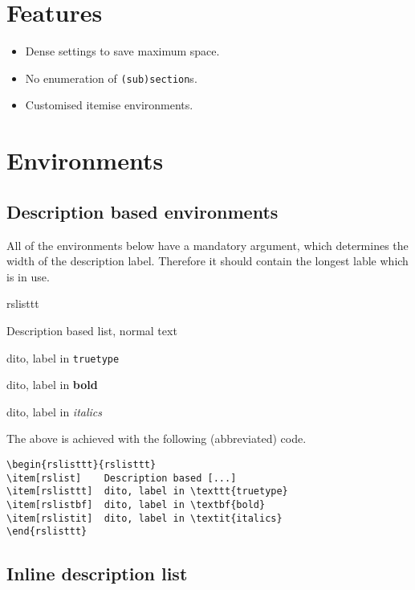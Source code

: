 \documentclass[   %
  final,          %
  a4paper,        %
  portrait,       %
  rscols=3,       %
  margin=1.0cm,   %
  titlepage,      %
]{refsheet}
\begin{document}
\section{Features}

\begin{itemize}
\item Dense settings to save maximum space.
\item No enumeration of \texttt{(sub)section}s.
\item Customised itemise environments.
\end{itemize}

\section{Environments}

\subsection{Description based environments}

All of the environments below have a mandatory argument, 
which determines the width of the description label. 
Therefore it should contain the longest lable which is in use.

\begin{rslisttt}{rslisttt}
\item[rslist]    Description based list, normal text
\item[rslisttt]  dito, label in \texttt{truetype}
\item[rslistbf]  dito, label in \textbf{bold}
\item[rslistit]  dito, label in \textit{italics}
\end{rslisttt}

The above is achieved with the following (abbreviated) code.

\begin{lstlisting}
\begin{rslisttt}{rslisttt}
\item[rslist]    Description based [...]
\item[rslisttt]  dito, label in \texttt{truetype}
\item[rslistbf]  dito, label in \textbf{bold}
\item[rslistit]  dito, label in \textit{italics}
\end{rslisttt}
\end{lstlisting}

\subsection{Inline description list}
\end{document}
